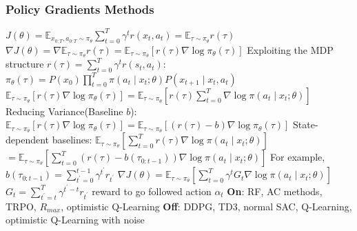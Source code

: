 \documentclass[a4paper, 11pt, landscape]{article}
\begin{document}
\begin{multicols*}{3}
\subsubsection{Policy Gradients Methods}
$J(\theta)=\mathbb{E}_{x_{0: T}, a_{0: T} \sim \pi_{\theta}} \sum_{t=0}^{T} \gamma^{t} r\left(x_{t}, a_{t}\right)=\mathbb{E}_{\tau \sim \pi_{\theta}} r(\tau)$
\newline $\nabla J(\theta)=\nabla \mathbb{E}_{\tau \sim \pi_{\theta}} r(\tau)=\mathbb{E}_{\tau \sim \pi_{\theta}}\left[r(\tau) \nabla \log \pi_{\theta}(\tau)\right]$
\newline Exploiting the MDP structure $r(\tau)=\sum_{t=0}^{T} \gamma^{t} r\left(s_{t}, a_{t}\right)$:
\newline $\pi_{\theta}(\tau)=P\left(x_{0}\right) \prod_{t=0}^{T} \pi\left(a_{t} \mid x_{t} ; \theta\right) P\left(x_{t+1} \mid x_{t}, a_{t}\right)$
\newline $\mathbb{E}_{\tau \sim \pi_{\theta}}\left[r(\tau) \nabla \log \pi_{\theta}(\tau)\right]=\mathbb{E}_{\tau \sim \pi_{\theta}}\left[r(\tau) \sum_{t=0}^{T} \nabla \log \pi\left(a_{t} \mid x_{t} ; \theta\right)\right]$
\newline Reducing Variance(Baseline $b$):
\newline $\mathbb{E}_{\tau \sim \pi_{\theta}}\left[r(\tau) \nabla \log \pi_{\theta}(\tau)\right]=\mathbb{E}_{\tau \sim \pi_{\theta}}\left[(r(\tau)-b) \nabla \log \pi_{\theta}(\tau)\right]$
\newline State-dependent baselines: $\mathbb{E}_{\tau \sim \pi_{\theta}}\left[\sum_{t=0}^{T} r(\tau) \nabla \log \pi\left(a_{t} \mid x_{t} ; \theta\right)\right]$
\newline $=\mathbb{E}_{\tau \sim \pi_{\theta}}\left[\sum_{t=0}^{T}\left(r(\tau)-b\left(\tau_{0: t-1}\right)\right) \nabla \log \pi\left(a_{t} \mid x_{t} ; \theta\right)\right]$
\newline  For example, $b\left(\tau_{0: t-1}\right)=\sum_{t^{\prime}=0}^{t-1} \gamma^{t^{\prime}} r_{t^{\prime}}$
\newline  $\nabla J(\theta)=\mathbb{E}_{\tau \sim \pi_{\theta}}\left[\sum_{t=0}^{T} \gamma^{t} G_{t} \nabla \log \pi\left(a_{t} \mid x_{t} ; \theta\right)\right]$
\newline  $G_{t}=\sum_{t^{\prime}=t}^{T} \gamma^{t^{\prime}-t} r_{t^{\prime}}$ reward to go followed action $\alpha_t$
\newline \textbf{On}: RF, AC methods, TRPO, $R_{max}$, optimistic Q-Learning
\newline \textbf{Off}: DDPG, TD3, normal SAC, Q-Learning, optimistic Q-Learning with noise


\end{multicols*}
\end{document}
